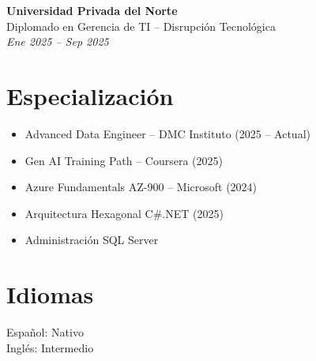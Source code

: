 \documentclass[11pt,a4paper]{article}
\begin{document}
\vspace{4pt}

\textbf{Universidad Privada del Norte}\\
Diplomado en Gerencia de TI – Disrupción Tecnológica\\
\textit{Ene 2025 – Sep 2025}

\section*{Especialización}

\begin{itemize}[leftmargin=*]
  \item Advanced Data Engineer – DMC Instituto (2025 – Actual)
  \item Gen AI Training Path – Coursera (2025)
  \item Azure Fundamentals AZ-900 – Microsoft (2024)
  \item Arquitectura Hexagonal C\#.NET (2025)
  \item Administración SQL Server
\end{itemize}

\section*{Idiomas}

Español: Nativo\\
Inglés: Intermedio
\end{document}
